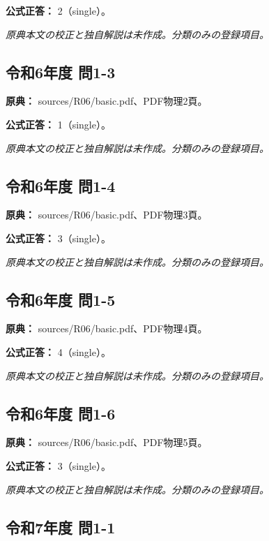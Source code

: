 \textbf{公式正答：} 2（single）。

\par\textit{原典本文の校正と独自解説は未作成。分類のみの登録項目。}

\subsection{令和6年度 問1-3}
\label{q:r06-reg-basic-1-3}

\noindent\textbf{原典：} sources/R06/basic.pdf、PDF物理2頁。

\textbf{公式正答：} 1（single）。

\par\textit{原典本文の校正と独自解説は未作成。分類のみの登録項目。}

\subsection{令和6年度 問1-4}
\label{q:r06-reg-basic-1-4}

\noindent\textbf{原典：} sources/R06/basic.pdf、PDF物理3頁。

\textbf{公式正答：} 3（single）。

\par\textit{原典本文の校正と独自解説は未作成。分類のみの登録項目。}

\subsection{令和6年度 問1-5}
\label{q:r06-reg-basic-1-5}

\noindent\textbf{原典：} sources/R06/basic.pdf、PDF物理4頁。

\textbf{公式正答：} 4（single）。

\par\textit{原典本文の校正と独自解説は未作成。分類のみの登録項目。}

\subsection{令和6年度 問1-6}
\label{q:r06-reg-basic-1-6}

\noindent\textbf{原典：} sources/R06/basic.pdf、PDF物理5頁。

\textbf{公式正答：} 3（single）。

\par\textit{原典本文の校正と独自解説は未作成。分類のみの登録項目。}

\subsection{令和7年度 問1-1}
\label{q:r07-reg-basic-1-1}

